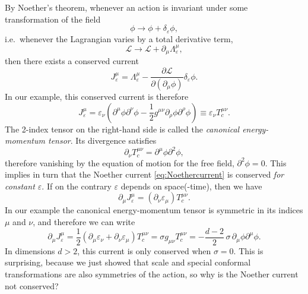 \documentclass[a4paper,12pt]{article}
\newcommand{\Lagr}{\mathscr{L}}
\numberwithin{equation}{section}
\begin{document}
By Noether's theorem, whenever an action is invariant under some transformation of the field
\begin{equation}
	\phi \to \phi + \delta_\varepsilon \phi,
\end{equation}
i.e.~whenever the Lagrangian varies by a total derivative term,
\begin{equation}
	\Lagr \to \Lagr + \partial_\mu \Lambda_\varepsilon^\mu,
\end{equation}
then there exists a conserved current
\begin{equation}
	J_\varepsilon^\mu = \Lambda^\mu_\varepsilon
	- \frac{\partial \Lagr}{\partial (\partial_\mu \phi)}
	\delta_\varepsilon \phi.
\end{equation}
In our example, this conserved current is therefore
\begin{equation}
	J_\varepsilon^\mu = \varepsilon_\nu
	\left( \partial^\mu \phi \partial^\nu \phi
	- \frac{1}{2} g^{\mu\nu} \partial_\rho \phi \partial^\rho \phi
	\right)
	\equiv \varepsilon_\nu T_c^{\mu\nu}.
	\label{eq:Noethercurrent}
\end{equation}
The 2-index tensor on the right-hand side is called the \emph{canonical energy-momentum tensor}.
Its divergence satisfies
\begin{equation}
	\partial_\nu T_c^{\mu\nu}
	= \partial^\mu \phi \partial^2 \phi,
	\label{eq:Tcanonical:conservation}
\end{equation}
therefore vanishing by the equation of motion for the free field, $\partial^2 \phi = 0$.
This implies in turn that the Noether current \eqref{eq:Noethercurrent} is conserved \emph{for constant $\varepsilon$}.
If on the contrary $\varepsilon$ depends on space(-time), then we have
\begin{equation}
	\partial_\mu J_\varepsilon^\mu
	= (\partial_\nu \varepsilon_\mu) T_c^{\mu\nu}.
\end{equation}
In our example the canonical energy-momentum tensor is symmetric in its indices $\mu$ and $\nu$, and therefore we can write
\begin{equation}
	\partial_\mu J_\varepsilon^\mu
	= \frac{1}{2} (\partial_\mu \varepsilon_\nu
	+ \partial_\nu \varepsilon_\mu) T_c^{\mu\nu}
	= \sigma g_{\mu\nu} T_c^{\mu\nu}
	= -\frac{d-2}{2} \, \sigma \, \partial_\mu \phi \partial^\mu \phi.
\end{equation}
In dimensions $d > 2$, this current is only conserved when $\sigma = 0$. This is surprising, because we just showed that scale and special conformal transformations are also symmetries of the action, so why is the Noether current not conserved?
\end{document}
